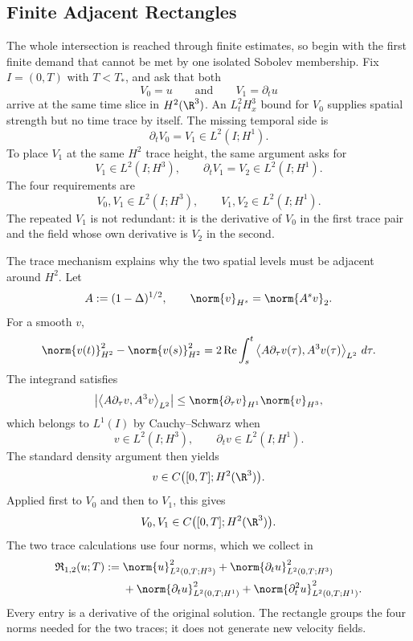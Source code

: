
\subsection{Finite Adjacent Rectangles}\label{sub:FiniteAdjacentRectangles}

The whole intersection is reached through finite estimates, so begin with the first finite demand that cannot be met by one isolated Sobolev membership.
Fix \(I=(0,T)\) with \(T<T_*\), and ask that both
\[
  V_0=u
  \qquad\text{and}\qquad
  V_1=\partial_tu
\]
arrive at the same time slice in \(H^2(\R^3)\).
An \(L^2_tH^3_x\) bound for \(V_0\) supplies spatial strength but no time trace by itself.
The missing temporal side is
\[
  \partial_tV_0=V_1\in L^2(I;H^1).
\]
To place \(V_1\) at the same \(H^2\) trace height, the same argument asks for
\[
  V_1\in L^2(I;H^3),
  \qquad
  \partial_tV_1=V_2\in L^2(I;H^1).
\]
The four requirements are
\[
  V_0,V_1\in L^2(I;H^3),
  \qquad
  V_1,V_2\in L^2(I;H^1).
\]
The repeated \(V_1\) is not redundant: it is the derivative of \(V_0\) in the first trace pair and the field whose own derivative is \(V_2\) in the second.

The trace mechanism explains why the two spatial levels must be adjacent around \(H^2\).
Let
\[
  A:=(1-\Delta)^{1/2},
  \qquad
  \norm{v}_{H^s}=\norm{A^sv}_2.
\]
For a smooth \(v\),
\[
  \norm{v(t)}_{H^2}^2-\norm{v(s)}_{H^2}^2
  =
  2\operatorname{Re}
  \int_s^t
  \left\langle
    A\partial_\tau v(\tau),
    A^3v(\tau)
  \right\rangle_{L^2}
  \,d\tau.
\]
The integrand satisfies
\[
  \left|
    \left\langle
      A\partial_\tau v,
      A^3v
    \right\rangle_{L^2}
  \right|
  \le
  \norm{\partial_\tau v}_{H^1}
  \norm{v}_{H^3},
\]
which belongs to \(L^1(I)\) by Cauchy--Schwarz when
\[
  v\in L^2(I;H^3),
  \qquad
  \partial_tv\in L^2(I;H^1).
\]
The standard density argument then yields
\[
  v\in C\bigl([0,T];H^2(\R^3)\bigr).
\]
Applied first to \(V_0\) and then to \(V_1\), this gives
\[
  V_0,V_1
  \in
  C\bigl([0,T];H^2(\R^3)\bigr).
\]
The two trace calculations use four norms, which we collect in
\begin{align*}
  \mathfrak R_{1,2}(u;T)
  :={}&
  \norm{u}_{L^2(0,T;H^3)}^2
  +
  \norm{\partial_tu}_{L^2(0,T;H^3)}^2
  \\
  &+
  \norm{\partial_tu}_{L^2(0,T;H^1)}^2
  +
  \norm{\partial_t^2u}_{L^2(0,T;H^1)}^2.
\end{align*}
Every entry is a derivative of the original solution.
The rectangle groups the four norms needed for the two traces; it does not generate new velocity fields.

